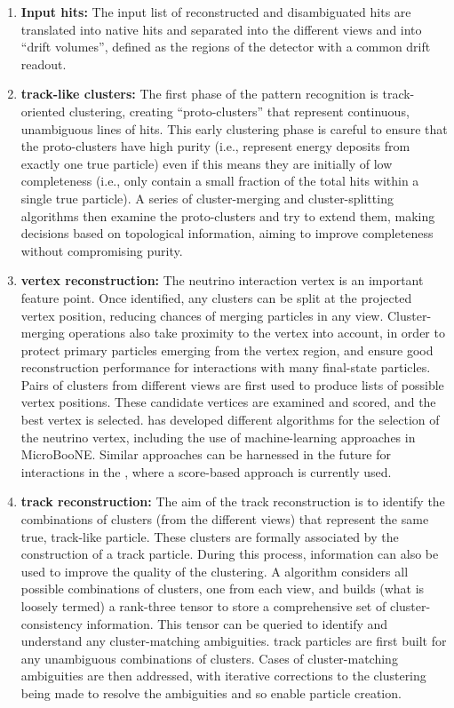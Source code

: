 \begin{enumerate}
\item{\bf Input hits:} The input list of reconstructed and disambiguated \twod hits are translated into native  \twod hits and separated into the different views and into ``drift volumes'', defined as the regions of the detector with a common drift readout.
\item{\bf \twod track-like clusters:}  The first phase of the  pattern recognition is track-oriented \twod clustering, creating ``proto-clusters'' that represent continuous, unambiguous lines of \twod hits. This early clustering phase is careful to ensure that the proto-clusters have high purity (i.e., represent energy deposits from exactly one true particle) even if this means they are initially of low completeness (i.e., only contain a small fraction of the total hits within a single true particle). A series of cluster-merging and cluster-splitting algorithms then examine the \twod proto-clusters and try to extend them, making decisions based on topological information, aiming to improve completeness without compromising purity.
\item{\bf \threed vertex reconstruction:} The neutrino interaction vertex is an important feature point. Once identified, any \twod clusters can be split at the projected vertex position, reducing chances of merging particles in any view. Cluster-merging operations also take proximity to the vertex into account, in order to protect primary particles emerging from the vertex region, and ensure good reconstruction performance for interactions with many final-state particles. Pairs of \twod clusters from different views are first used to produce lists of possible \threed vertex positions. These candidate vertices are examined and scored, and the best vertex is selected.  has developed different algorithms for the selection of the neutrino vertex, including the use of machine-learning approaches in MicroBooNE. Similar approaches can be harnessed in the future for interactions in %
the , where a score-based approach is currently used.
\item{\bf \threed track reconstruction:} The aim of the \threed track reconstruction is to identify the combinations of \twod clusters (from the different views) that represent the same true, track-like particle. These \twod clusters are formally associated by the construction of a \threed track particle. During this process, \threed information can also be used to improve the quality of the \twod clustering. A  algorithm considers all possible combinations of \twod clusters, one from each view, and builds (what is loosely termed) a rank-three tensor to store a comprehensive set of cluster-consistency information. This tensor can be queried to identify and understand any cluster-matching ambiguities. \threed track particles are first built for any unambiguous combinations of \twod clusters. Cases of cluster-matching ambiguities are then addressed, with iterative corrections to the \twod clustering being made to resolve the ambiguities and so enable \threed particle creation.

\end{enumerate}
